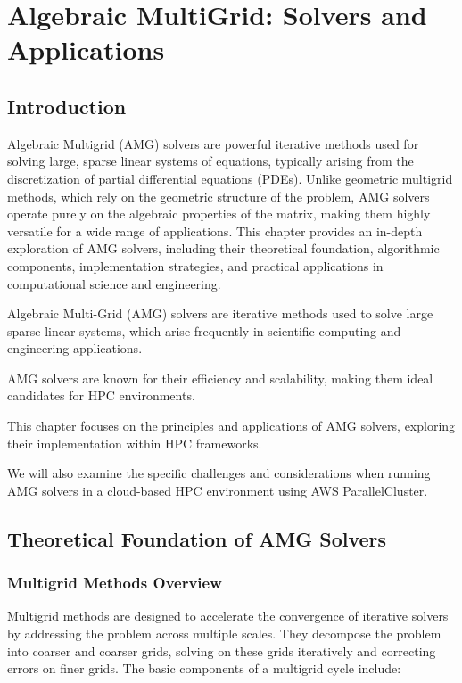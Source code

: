 

\chapter{Algebraic MultiGrid: Solvers and Applications}

\section{Introduction}

Algebraic Multigrid (AMG) solvers are powerful iterative methods used for solving large, sparse linear systems of equations, typically arising from the discretization of partial differential equations (PDEs). Unlike geometric multigrid methods, which rely on the geometric structure of the problem, AMG solvers operate purely on the algebraic properties of the matrix, making them highly versatile for a wide range of applications. This chapter provides an in-depth exploration of AMG solvers, including their theoretical foundation, algorithmic components, implementation strategies, and practical applications in computational science and engineering.

Algebraic Multi-Grid (AMG) solvers are iterative methods used to solve large sparse linear systems, which arise frequently in scientific computing and engineering applications. 

AMG solvers are known for their efficiency and scalability, making them ideal candidates for HPC environments.

This chapter focuses on the principles and applications of AMG solvers, exploring their implementation within HPC frameworks. 

We will also examine the specific challenges and considerations when running AMG solvers in a cloud-based HPC environment using AWS ParallelCluster.

\section{Theoretical Foundation of AMG Solvers}

\subsection{Multigrid Methods Overview}

Multigrid methods are designed to accelerate the convergence of iterative solvers by addressing the problem across multiple scales. They decompose the problem into coarser and coarser grids, solving on these grids iteratively and correcting errors on finer grids. The basic components of a multigrid cycle include:

